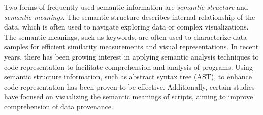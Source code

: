 Two forms of frequently used semantic information are \emph{semantic structure} and \emph{semantic meanings}.
The semantic structure describes internal relationship of the data, which is often used to navigate exploring data or complex visualizations\cite{Borner:2000:EVSS, Albertoni:2005:VSA, Willett:2007:SW}.
The semantic meanings, such as keywords, are often used to characterize data samples for efficient similarity measurements\cite{Brandes:2002:VBN, Thomas:2004:FPG, Xie:2019:SBM, Wu:2011:SPWC} and visual representations\cite{Sen:2017:Cartograph, Lai:2020:AAS}.
In recent years, there has been growing interest in applying semantic analysis techniques to code representation to facilitate comprehension and analysis of programs.
Using semantic structure information, such as abstract syntax tree (AST), to enhance code representation has been proven to be effective\cite{Guo:2021:GraphCodeBERT, Guo:2022:UniXcoder}.
Additionally, certain studies have focused on visualizing the semantic meanings of scripts, aiming to improve comprehension of data provenance\cite{Xiong:2022:VSD, Feng:2023:XNLI}.



